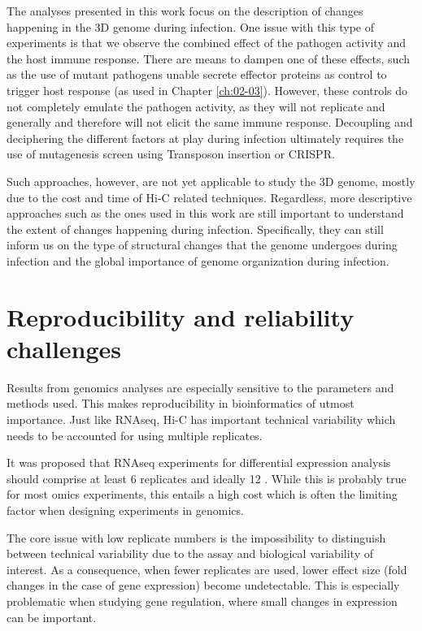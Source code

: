 The analyses presented in this work focus on the description of changes happening in the 3D genome during infection. One issue with this type of experiments is that we observe the combined effect of the pathogen activity and the host immune response. There are means to dampen one of these effects, such as the use of mutant pathogens unable secrete effector proteins as control to trigger host response (as used in Chapter \ref{ch:02-03}). However, these controls do not completely emulate the pathogen activity, as they will not replicate and generally \cite{vogelConjugativeTransferVirulence1998} and therefore will not elicit the same immune response. Decoupling and deciphering the different factors at play during infection ultimately requires the use of mutagenesis screen using Transposon insertion or CRISPR.

Such approaches, however, are not yet applicable to study the 3D genome, mostly due to the cost and time of Hi-C related techniques. Regardless, more descriptive approaches such as the ones used in this work are still important to understand the extent of changes happening during infection. Specifically, they can still inform us on the type of structural changes that the genome undergoes during infection and the global importance of genome organization during infection.


\section{Reproducibility and reliability challenges}
Results from genomics analyses are especially sensitive to the parameters and methods used. This makes reproducibility in bioinformatics of utmost importance. Just like RNAseq, Hi-C has important technical variability which needs to be accounted for using multiple replicates.

It was proposed that RNAseq experiments for differential expression analysis should comprise at least 6 replicates and ideally 12 \cite{schurchHowManyBiological2016}. While this is probably true for most omics experiments, this entails a high cost which is often the limiting factor when designing experiments in genomics.

The core issue with low replicate numbers is the impossibility to distinguish between technical variability due to the assay and biological variability of interest. As a consequence, when fewer replicates are used, lower effect size (fold changes in the case of gene expression) become undetectable. This is especially problematic when studying gene regulation, where small changes in expression can be important.

